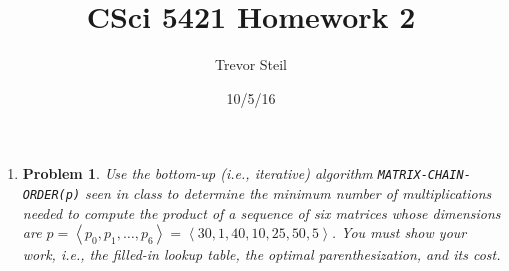 \documentclass[a4paper]{article}
\title{CSci 5421 Homework 2}
\date{10/5/16}
\author{Trevor Steil}
\newtheorem*{problem}{Problem}
\newcommand{\la}{\left \langle}
\newcommand{\ra}{\right \rangle}
\begin{document}
\maketitle

\begin{enumerate}
  \item
    \begin{problem}
      Use the \textit{bottom-up} (i.e., iterative) algorithm \texttt{MATRIX-CHAIN-ORDER(p)} seen in class to determine the minimum number of
      multiplications needed to compute the product of a sequence of six matrices whose dimensions are $p = \la p_0, p_1, \dots, p_6 \ra = \la 30, 1,
      40, 10, 25, 50, 5 \ra$. You must show your work, i.e., the filled-in lookup table, the optimal parenthesization, and its cost.
    \end{problem}


\end{enumerate}
\end{document}
